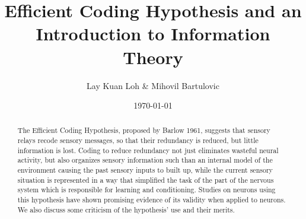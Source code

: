 \documentclass[twoside]{article}
\title{\vspace{-15mm}\fontsize{24pt}{10pt}\selectfont\textbf{Efficient Coding Hypothesis and an Introduction to Information Theory}} %
\author{Lay Kuan Loh \& Mihovil Bartulovic}
\date{\today}
\begin{document}
\maketitle %

\thispagestyle{fancy} %





\begin{abstract}

\noindent The Efficient Coding Hypothesis, proposed by Barlow 1961, suggests that sensory relays recode sensory messages, so that their redundancy is reduced, but little information is lost. Coding to reduce redundancy not just eliminates wasteful neural activity, but also organizes sensory information such than an internal model of the environment causing the past sensory inputs to built up, while the current sensory situation is represented in a way that simplified the task of the part of the nervous system which is responsible for learning and conditioning. Studies on neurons using this hypothesis have shown promising evidence of its validity when applied to neurons. We also discuss some criticism of the hypothesis' use and their merits.

\end{abstract}









\end{document}
